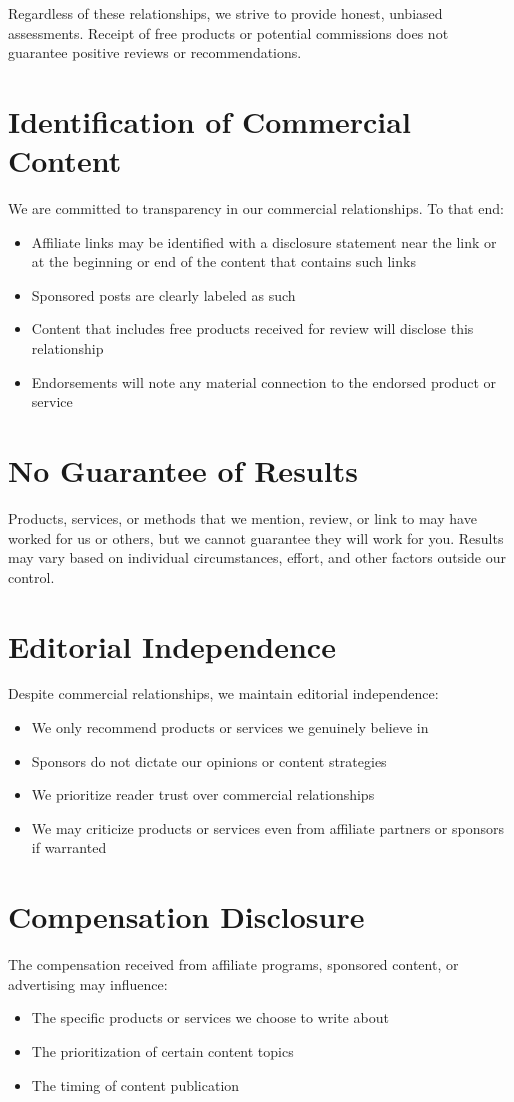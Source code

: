 \documentclass[11pt]{article}
\begin{document}
Regardless of these relationships, we strive to provide honest, unbiased assessments. Receipt of free products or potential commissions does not guarantee positive reviews or recommendations.

\section{Identification of Commercial Content}
We are committed to transparency in our commercial relationships. To that end:
\begin{itemize}
  \item Affiliate links may be identified with a disclosure statement near the link or at the beginning or end of the content that contains such links
  \item Sponsored posts are clearly labeled as such
  \item Content that includes free products received for review will disclose this relationship
  \item Endorsements will note any material connection to the endorsed product or service
\end{itemize}

\section{No Guarantee of Results}
Products, services, or methods that we mention, review, or link to may have worked for us or others, but we cannot guarantee they will work for you. Results may vary based on individual circumstances, effort, and other factors outside our control.

\section{Editorial Independence}
Despite commercial relationships, we maintain editorial independence:
\begin{itemize}
  \item We only recommend products or services we genuinely believe in
  \item Sponsors do not dictate our opinions or content strategies
  \item We prioritize reader trust over commercial relationships
  \item We may criticize products or services even from affiliate partners or sponsors if warranted
\end{itemize}

\section{Compensation Disclosure}
The compensation received from affiliate programs, sponsored content, or advertising may influence:
\begin{itemize}
  \item The specific products or services we choose to write about
  \item The prioritization of certain content topics
  \item The timing of content publication
\end{itemize}
\end{document}
